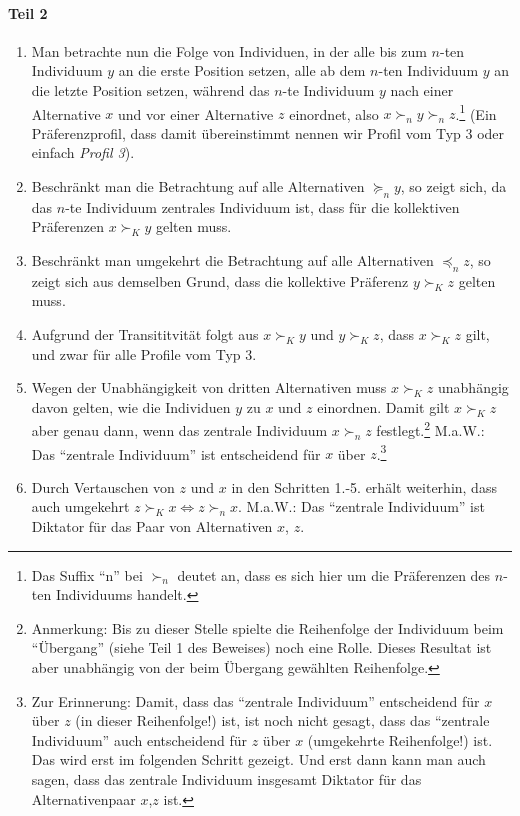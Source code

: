 \paragraph{Teil 2}

\begin{enumerate}
  \item Man betrachte nun die Folge von Individuen, in der alle bis zum $n$-ten
  Individuum $y$ an die erste Position setzen, alle ab dem $n$-ten Individuum
  $y$ an die letzte Position setzen, während das $n$-te Individuum $y$ nach
  einer Alternative $x$ und vor einer Alternative $z$ einordnet, 
  also $x \succ_n y \succ_n
  z$.\footnote{Das Suffix "`n"' bei $\succ_n$ deutet an, dass es sich hier um
  die Präferenzen des $n$-ten Individuums handelt.} (Ein Präferenzprofil, dass
  damit übereinstimmt nennen wir Profil vom Typ 3 oder einfach {\em Profil 3}).

  \item\label{Teil2Punkt2} Beschränkt man die Betrachtung auf alle Alternativen
  $\succeq_n y$, so zeigt sich, da das $n$-te Individuum zentrales Individuum
  ist, dass für die kollektiven Präferenzen $x \succ_K y$ gelten muss.
  
  \item Beschränkt man umgekehrt die Betrachtung auf alle Alternativen $\preceq_n
  z$, so zeigt sich aus demselben Grund, dass die kollektive Präferenz $y \succ_K
  z$ gelten muss.
  
  \item Aufgrund der Transititvität folgt aus $x \succ_K y$ und $y \succ_K z$,
  dass $x \succ_K z$ gilt, und zwar für alle Profile vom Typ 3.
  
  \item Wegen der Unabhängigkeit von dritten Alternativen muss $x \succ_K z$
  unabhängig davon gelten, wie die Individuen $y$ zu $x$ und $z$ einordnen. Damit
  gilt $x \succ_K z$ aber genau dann, wenn das zentrale Individuum $x \succ_n z$
  festlegt.\footnote{Anmerkung: Bis zu dieser Stelle spielte die Reihenfolge der
  Individuum beim "`Übergang"' (siehe Teil 1 des Beweises) noch eine Rolle.
  Dieses Resultat ist aber unabhängig von der beim Übergang gewählten
  Reihenfolge.} M.a.W.: Das "`zentrale Individuum"' ist entscheidend für $x$ über
  $z$.\footnote{Zur Erinnerung: Damit, dass das "`zentrale Individuum"'
  entscheidend für $x$ über $z$ (in dieser Reihenfolge!) ist, ist noch nicht
  gesagt, dass das "`zentrale Individuum"' auch entscheidend für $z$ über $x$
  (umgekehrte Reihenfolge!) ist. Das wird erst im folgenden Schritt gezeigt. Und
  erst dann kann man auch sagen, dass das zentrale Individuum insgesamt Diktator
  für das Alternativenpaar $x$,$z$ ist.}
  
  \item Durch Vertauschen von $z$ und $x$ in den Schritten 1.-5. erhält
  weiterhin, dass auch umgekehrt $z \succ_K x \Leftrightarrow z \succ_n x$.
  M.a.W.: Das "`zentrale Individuum"' ist Diktator für das Paar von Alternativen
  $x$, $z$.
\end{enumerate}

